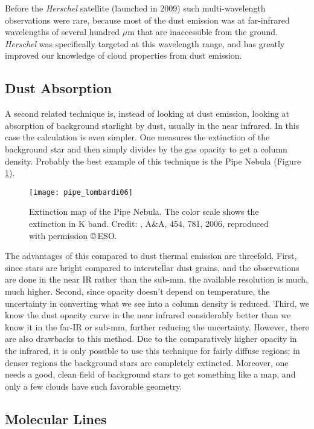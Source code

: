 Before the \textit{Herschel} satellite (launched in 2009) such multi-wavelength observations were rare, because most of the dust emission was at far-infrared wavelengths of several hundred $\mu$m that are inaccessible from the ground. \textit{Herschel} was specifically targeted at this wavelength range, and has greatly improved our knowledge of cloud properties from dust emission.

\subsection{Dust Absorption}

A second related technique is, instead of looking at dust emission, looking at absorption of background starlight by dust, usually in the near infrared. In this case the calculation is even simpler. One measures the extinction of the background star and then simply divides by the gas opacity to get a column density. Probably the best example of this technique is the Pipe Nebula (Figure \ref{fig:pipe_lombardi06}).  

\begin{figure}
\texttt{[image: pipe\_lombardi06]}
\caption[Dust extinction map of the Pipe Nebula]{
\label{fig:pipe_lombardi06}
Extinction map of the Pipe Nebula. The color scale shows the extinction in K band. Credit: \citeauthor{lombardi06a}, A\&A, 454, 781, 2006, reproduced with permission \copyright\,ESO.
}
\end{figure}

The advantages of this compared to dust thermal emission are threefold. First, since stars are bright compared to interstellar dust grains, and the observations are done in the near IR rather than the sub-mm, the available resolution is much, much higher. Second, since opacity doesn't depend on temperature, the uncertainty in converting what we see into a column density is reduced. Third, we know the dust opacity curve in the near infrared considerably better than we know it in the far-IR or sub-mm, further reducing the uncertainty. However, there are also drawbacks to this method. Due to the comparatively higher opacity in the infrared, it is only possible to use this technique for fairly diffuse regions; in denser regions the background stars are completely extincted. Moreover, one needs a good, clean field of background stars to get something like a map, and only a few clouds have such favorable geometry.


\subsection{Molecular Lines}
\label{ssec:molecular_lines}


